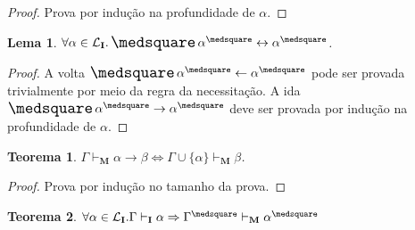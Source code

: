 \documentclass{report}
\newtheorem{lemma}{Lema}
\newtheorem{theorem}{Teorema}
\begin{document}
    \begin{proof}
        Prova por indução na profundidade de $\alpha$.
    \end{proof}

    \begin{lemma}
        $\forall \alpha \in \mathcal{L}_\mathbf{I} . \nec\alpha^\medsquare \leftrightarrow \alpha^\medsquare$.
    \end{lemma}

    \begin{proof}
        A volta $\nec\alpha^\medsquare\leftarrow\alpha^\medsquare$ pode ser provada trivialmente por meio da regra da necessitação. A ida $\nec\alpha^\medsquare\rightarrow\alpha^\medsquare$ deve ser provada por indução na profundidade de $\alpha$.
    \end{proof}

    \begin{theorem}
        $\Gamma\vdash_\mathbf{M}\alpha\to\beta\Leftrightarrow\Gamma\cup\{\alpha\}\vdash_\mathbf{M}\beta$.
    \end{theorem}

    \begin{proof}
        Prova por indução no tamanho da prova.
    \end{proof}

    \begin{theorem}
        $\forall \alpha \in \mathcal{L}_\mathbf{I} . \Gamma \vdash_\mathbf{I} \alpha \Rightarrow \Gamma^\medsquare \vdash_\mathbf{M} \alpha^\medsquare$
    \end{theorem}
\end{document}
